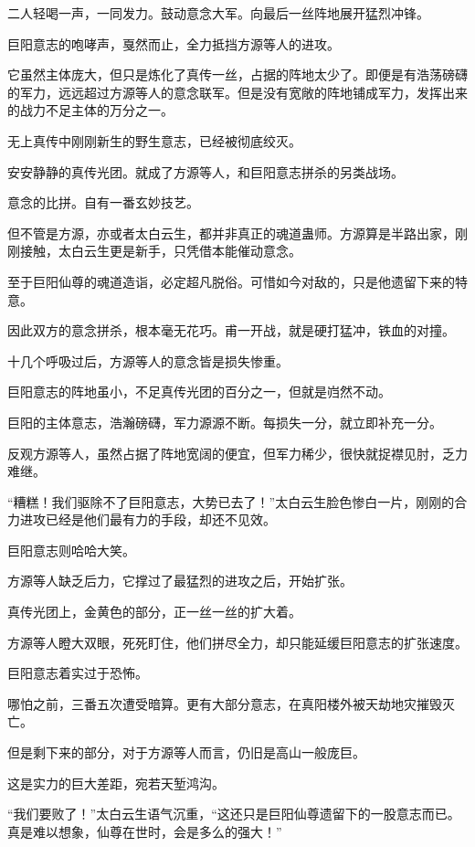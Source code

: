 \begin{this_body}
二人轻喝一声，一同发力。鼓动意念大军。向最后一丝阵地展开猛烈冲锋。

巨阳意志的咆哮声，戛然而止，全力抵挡方源等人的进攻。

它虽然主体庞大，但只是炼化了真传一丝，占据的阵地太少了。即便是有浩荡磅礴的军力，远远超过方源等人的意念联军。但是没有宽敞的阵地铺成军力，发挥出来的战力不足主体的万分之一。

无上真传中刚刚新生的野生意志，已经被彻底绞灭。

安安静静的真传光团。就成了方源等人，和巨阳意志拼杀的另类战场。

意念的比拼。自有一番玄妙技艺。

但不管是方源，亦或者太白云生，都并非真正的魂道蛊师。方源算是半路出家，刚刚接触，太白云生更是新手，只凭借本能催动意念。

至于巨阳仙尊的魂道造诣，必定超凡脱俗。可惜如今对敌的，只是他遗留下来的特意。

因此双方的意念拼杀，根本毫无花巧。甫一开战，就是硬打猛冲，铁血的对撞。

十几个呼吸过后，方源等人的意念皆是损失惨重。

巨阳意志的阵地虽小，不足真传光团的百分之一，但就是岿然不动。

巨阳的主体意志，浩瀚磅礴，军力源源不断。每损失一分，就立即补充一分。

反观方源等人，虽然占据了阵地宽阔的便宜，但军力稀少，很快就捉襟见肘，乏力难继。

“糟糕！我们驱除不了巨阳意志，大势已去了！”太白云生脸色惨白一片，刚刚的合力进攻已经是他们最有力的手段，却还不见效。

巨阳意志则哈哈大笑。

方源等人缺乏后力，它撑过了最猛烈的进攻之后，开始扩张。

真传光团上，金黄色的部分，正一丝一丝的扩大着。

方源等人瞪大双眼，死死盯住，他们拼尽全力，却只能延缓巨阳意志的扩张速度。

巨阳意志着实过于恐怖。

哪怕之前，三番五次遭受暗算。更有大部分意志，在真阳楼外被天劫地灾摧毁灭亡。

但是剩下来的部分，对于方源等人而言，仍旧是高山一般庞巨。

这是实力的巨大差距，宛若天堑鸿沟。

“我们要败了！”太白云生语气沉重，“这还只是巨阳仙尊遗留下的一股意志而已。真是难以想象，仙尊在世时，会是多么的强大！”


\end{this_body}
